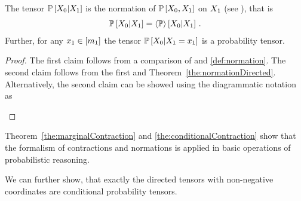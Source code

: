 \begin{theorem}\label{the:conditionalContraction}
	The tensor $\mathbb{P}\left[X_{0}|X_{1}\right]$ is the normation of $\mathbb{P}\left[X_{0},X_{1}\right]$ on $X_{1}$  (see ), that is
	\begin{align*}
		\mathbb{P}\left[X_{0}|X_{1}\right]   
		= \left\langle \mathbb{P}\right\rangle \left[ X_{0} | X_{1} \right] \, . 
	\end{align*}
	Further, for any $x_{1}\in[m_{1}]$ the tensor $\mathbb{P}\left[X_{0}|X_{1}=x_{1}\right]$ is a probability tensor.
\end{theorem}
\begin{proof}
	The first claim follows from a comparison of  and \ref{def:normation}.
	The second claim follows from the first and Theorem~\ref{the:normationDirected}.
	Alternatively, the second claim can be showed using the diagrammatic notation as
	\begin{center}
		
	\end{center}
\end{proof}



Theorem~\ref{the:marginalContraction} and \ref{the:conditionalContraction} show that the formalism of contractions and normations is applied in basic operations of probabilistic reasoning.

We can further show, that exactly the directed tensors with non-negative coordinates are conditional probability tensors.

